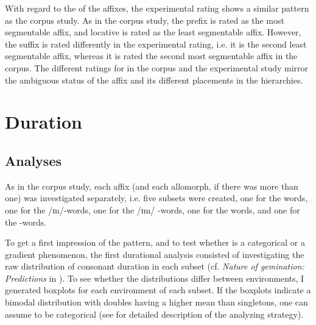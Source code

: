 With regard to the  of the affixes, the experimental rating shows a similar pattern as the corpus study. As in the corpus study, the prefix  is rated as the most segmentable affix, and locative  is rated as the least segmentable affix. However, the suffix  is rated differently in the experimental rating, i.e. it is the second least segmentable affix, whereas it is rated the second most segmentable affix in the corpus. The different ratings for  in the corpus and the experimental study mirror the ambiguous  status of the affix and its different placements in the  hierarchies. 



\section{Duration}


\subsection{Analyses} \label{analsyses duration experiment}

As in the corpus study, each affix (and each allomorph, if there was more than one) was investigated separately, i.e. five subsets were created, one for the  words, one for the /ɪn/-words, one for the /ɪm/ -words, one for the words, and one for the -words.

To get a first impression of the  pattern, and to test whether  is a categorical or a gradient phenomenon, the first durational analysis consisted of investigating the raw distribution of consonant duration in each subset (cf. \textit{Nature of {gemination}: Predictions }in ). To see whether the distributions differ between environments, I generated boxplots for each environment of each subset. 
If the boxplots indicate a bimodal distribution with doubles having a higher mean than singletons, one can assume  to be categorical (see  for detailed description of the analyzing strategy). 

